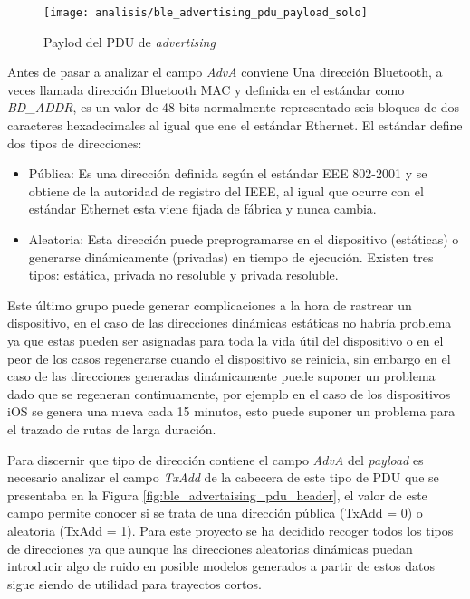 \documentclass[../proyecto.tex]{subfiles}
\begin{document}
\begin{figure}[H]
\centering
\texttt{[image: analisis/ble\_advertising\_pdu\_payload\_solo]}
\caption{Paylod del PDU de \textit{advertising}}
\label{fig:ble_advertising_pdu_payload_solo}
\end{figure}

Antes de pasar a analizar el campo \textit{AdvA} conviene
Una dirección Bluetooth, a veces llamada dirección Bluetooth MAC y definida en el estándar como \textit{BD\_ADDR}, es un valor de 48 bits normalmente representado seis bloques de dos caracteres hexadecimales al igual que ene el estándar Ethernet. El estándar define dos tipos de direcciones:

\begin{itemize}
  \item Pública: Es una dirección definida según el estándar EEE 802-2001 y se obtiene de la autoridad de registro del IEEE, al igual que ocurre con el estándar Ethernet esta viene fijada de fábrica y nunca cambia.
  \item Aleatoria: Esta dirección puede preprogramarse en el dispositivo (estáticas) o generarse dinámicamente (privadas) en tiempo de ejecución. Existen tres tipos: estática, privada no resoluble y privada resoluble.
\end{itemize}

Este último grupo puede generar complicaciones a la hora de rastrear un dispositivo, en el caso de las direcciones dinámicas estáticas no habría problema ya que estas pueden ser asignadas para toda la vida útil del dispositivo o en el peor de los casos regenerarse cuando el dispositivo se reinicia, sin embargo en el caso de las direcciones generadas dinámicamente puede suponer un problema dado que se regeneran continuamente, por ejemplo en el caso de los dispositivos iOS se genera una nueva cada 15 minutos, esto puede suponer un problema para el trazado de rutas de larga duración.

Para discernir que tipo de dirección contiene el campo \textit{AdvA} del \textit{payload} es necesario analizar el campo \textit{TxAdd} de la cabecera de este tipo de PDU que se presentaba en la Figura \ref{fig:ble_advertaising_pdu_header}, el valor de este campo permite conocer si se trata de una dirección pública (TxAdd = 0) o aleatoria (TxAdd = 1). Para este proyecto se ha decidido recoger todos los tipos de direcciones ya que aunque las direcciones aleatorias dinámicas puedan introducir algo de ruido en posible modelos generados a partir de estos datos sigue siendo de utilidad para trayectos cortos.
\end{document}
